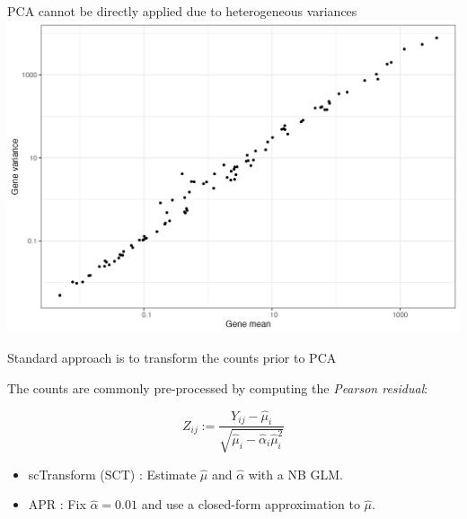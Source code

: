\documentclass[aspectratio=43]{beamer}
\begin{document}
\begin{frame}{PCA cannot be directly applied due to heterogeneous variances}
\centering 
\includegraphics[scale=0.4]{Fig/mean_variance_relationship.png}
\end{frame}

\begin{frame}{Standard approach is to transform the counts prior to PCA}

The counts are commonly pre-processed by computing the \textit{Pearson residual}:

\begin{equation*}
Z_{ij} := \frac{Y_{ij} - \hat{\mu}_{i}}{\sqrt{ \hat{\mu}_{i} - \hat{\alpha}_i \hat{\mu}_{i}^2}}
\end{equation*}

\begin{itemize}
\item scTransform (SCT) \cite{hafemeister2019normalization}: Estimate $\hat{\mu}$ and $\hat{\alpha}$ with a NB GLM.
\item APR \cite{lause2021analytic}: Fix $\hat{\alpha} = 0.01$ and use a closed-form approximation to $\hat{\mu}$. 
\end{itemize}
\end{frame}
\end{document}
